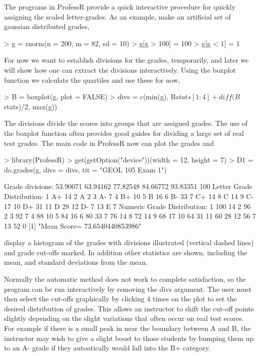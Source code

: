 \documentclass{article}
\begin{document}
The programs in ProfessR provide a quick interactive 
procedure for quickly assigning the scaled letter-grades.
As an example,  make an artificial set of gaussian distributed grades,
\begin{Schunk}
\begin{Sinput}
> g = rnorm(n = 200, m = 82, sd = 10)
> g[g > 100] = 100
> g[g < 1] = 1
\end{Sinput}
\end{Schunk}

For now we want to establish divisions for
the grades, temporarily, and later we will show how
one can extract the divisions interactively.
Using the boxplot function we calculate the quartiles
and use these for now,
\begin{Schunk}
\begin{Sinput}
> B = boxplot(g, plot = FALSE)
> divs = c(min(g), B$stats[1:4] + diff(B$stats)/2, max(g))
\end{Sinput}
\end{Schunk}
The divisions divide the scores
into groups that are assigned grades.
The use of the boxplot function often provides good 
guides for dividing a large set of 
real test grades.
The main code in ProfessR now can plot the grades and
\begin{Schunk}
\begin{Sinput}
> library(ProfessR)
> get(getOption("device"))(width = 12, height = 7)
> D1 = do.grades(g, divs = divs, tit = "GEOL 105 Exam 1")
\end{Sinput}
\begin{Soutput}
Grade divisions:
53.90071
63.94162
77.82548
84.66772
93.83351
100
Letter Grade Distribution:
1 A+ 14
2 A 2
3 A- 7
4 B+ 10
5 B 16
6 B- 33
7 C+ 14
8 C 14
9 C- 17
10 D+ 31
11 D 28
12 D- 7
13 E 7
Numeric Grade Distribution:
1 100 14
2 96 2
3 92 7
4 88 10
5 84 16
6 80 33
7 76 14
8 72 14
9 68 17
10 64 31
11 60 28
12 56 7
13 52 0
[1] "Mean Score= 73.6540440853986"
\end{Soutput}
\end{Schunk}
display a histogram of the grades with divisions
illustrated (vertical dashed lines)  and grade  cut-offs marked.
In addition other statistics are shown, including the mean,
and standard deviations from the mean.

Normally the automatic method does not work to complete satisfaction,
so the program can be run interactively by 
removing the  divs argument.
The user must then
select the cut-offs graphically by clicking 4 times on the
plot to set  the desired distribution of grades.
This allows an instructor to shift the
cut-off points slightly depending on
the slight variations that often occur on real test scores.
For example if there is 
a small peak in near the boundary between A and B,
the instructor may wish to give a slight boost
to those students by bumping them up to an A- grade
if they autoatically would fall into the B+ category.
\end{document}
